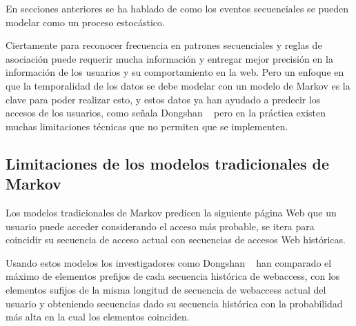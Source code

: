 %
En secciones anteriores se ha hablado de como los eventos secuenciales se pueden modelar como un proceso estocástico.

Ciertamente para reconocer frecuencia en patrones secuenciales y reglas de asociación puede requerir mucha  información y entregar mejor precisión en la información de los usuarios y su comportamiento en la web. Pero un enfoque en que la temporalidad de los datos se debe modelar con un modelo de Markov es la clave para poder realizar esto, y estos datos ya han ayudado a predecir los accesos de los usuarios, como señala Dongshan \etal~\cite{Dongshan2002} pero en la práctica existen muchas limitaciones técnicas que no permiten que se implementen. 


 





 
 
 \subsection{Limitaciones de los modelos tradicionales de Markov}
 
 
 Los modelos tradicionales de Markov predicen la siguiente página Web que un usuario puede acceder considerando el acceso más probable, se itera para  coincidir su secuencia de acceso actual con secuencias de accesos Web históricas.
 
 
 Usando estos modelos los investigadores como  Dongshan \etal~\cite{Dongshan2002} han comparado  el máximo de elementos  prefijos de cada secuencia histórica de webaccess,  con los elementos sufijos de la  misma longitud de secuencia de webaccess actual del usuario y obteniendo secuencias dado su secuencia histórica con la probabilidad más alta en la cual los elementos coinciden.
 
